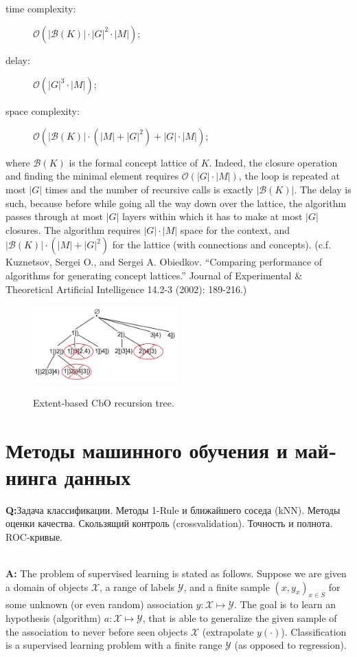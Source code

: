 \documentclass[a4paper]{article}
\newcommand{\Xcal}{\mathcal{X}}
\newcommand{\Ycal}{\mathcal{Y}}
\newcommand{\rus}[1]{\foreignlanguage{russian}{#1}}
\begin{document}
\begin{description}
    \item[time complexity:] $\mathcal{O}(|\mathcal{B}(K)|\cdot |G|^2 \cdot |M|)$;
    \item[delay:] $\mathcal{O}(|G|^3 \cdot |M|)$;
    \item[space complexity:] $\mathcal{O}(|\mathcal{B}(K)|\cdot(|M| + |G|^2)
                                          + |G| \cdot |M|)$;
\end{description}
where $\mathcal{B}(K)$ is the formal concept lattice of $K$. Indeed, the closure
operation and finding the minimal element requires $\mathcal{O}(|G| \cdot |M|)$,
the loop is repeated at most $|G|$ times and the number of recursive calls is exactly
$|\mathcal{B}(K)|$. The delay is such, because before while going all the way down
over the lattice, the algorithm passes through at most $|G|$ layers within which
it has to make at most $|G|$ closures. The algorithm requires $|G| \cdot |M|$ space
for the context, and $|\mathcal{B}(K)|\cdot(|M| + |G|^2)$ for the lattice (with
connections and concepts).
(c.f. Kuznetsov, Sergei O., and Sergei A. Obiedkov. ``Comparing performance of algorithms
for generating concept lattices.'' Journal of Experimental \& Theoretical Artificial
Intelligence 14.2-3 (2002): 189-216.)
\begin{figure}
    \centering
    \includegraphics[width=0.5\textwidth]{cbo_tree.png}
    \label{fig:cbo_tree}
    \caption{Extent-based CbO recursion tree.}
\end{figure}


\section{\rus{Методы машинного обучения и майнинга данных}} %
\label{sec:mldm}

\noindent\textbf{Q:}\rus{Задача классификации.  Методы 1-Rule и ближайшего соседа
(kNN). Методы оценки качества. Скользящий контроль (crossvalidation). Точность и
полнота. ROC-кривые.}

\hfill\\\textbf{A:}
The problem of supervised learning is stated as follows. Suppose we are given a
domain of objects $\Xcal$, a range of labels $\Ycal$, and a finite sample $(x, y_x)_{x\in S}$
for some unknown (or even random) association $y:\Xcal\mapsto\Ycal$. The goal is
to learn an hypothesis (algorithm) $a:\Xcal\mapsto\Ycal$, that is able to generalize
the given sample of the association to never before seen objects $\Xcal$ (extrapolate
$y(\cdot)$). Classification is a supervised learning problem with a finite range
$\Ycal$ (as opposed to regression).
\end{document}
